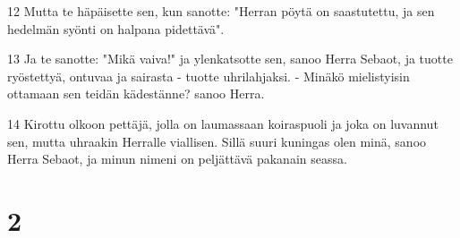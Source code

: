 \par 12 Mutta te häpäisette sen, kun sanotte: "Herran pöytä on saastutettu, ja sen hedelmän syönti on halpana pidettävä".
\par 13 Ja te sanotte: "Mikä vaiva!" ja ylenkatsotte sen, sanoo Herra Sebaot, ja tuotte ryöstettyä, ontuvaa ja sairasta - tuotte uhrilahjaksi. - Minäkö mielistyisin ottamaan sen teidän kädestänne? sanoo Herra.
\par 14 Kirottu olkoon pettäjä, jolla on laumassaan koiraspuoli ja joka on luvannut sen, mutta uhraakin Herralle viallisen. Sillä suuri kuningas olen minä, sanoo Herra Sebaot, ja minun nimeni on peljättävä pakanain seassa.

\chapter{2}

